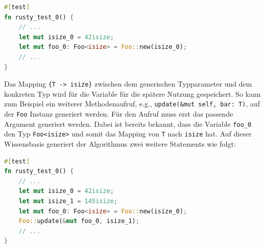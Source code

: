\documentclass{article}
\begin{document}
\begin{lstlisting}[language=Rust, style=boxed, caption={}, label=lst:building-generic-test-1]
#[test]
fn rusty_test_0() {
    // ...
    let mut isize_0 = 42isize;
    let mut foo_0: Foo<isize> = Foo::new(isize_0);
    // ...
}
\end{lstlisting}

Das Mapping \lstinline|{T -> isize}| zwischen dem generischen Typparameter und dem konkreten Typ wird für die Variable für die spätere Nutzung gespeichert. So kann zum Beispiel ein weiterer Methodenaufruf, e.g., \lstinline{update(&mut self, bar: T)}, auf der \lstinline{Foo} Instanz generiert werden. Für den Aufruf muss erst das passende Argument generiert werden. Dabei ist bereits bekannt, dass die Variable \lstinline{foo_0} den Typ \lstinline{Foo<isize>} und somit das Mapping von \lstinline{T} nach \lstinline{isize} hat. Auf dieser Wissensbasis generiert der Algorithmus zwei weitere Statements wie folgt:
\begin{lstlisting}[language=Rust, style=boxed, caption={}, label=lst:building-generic-test-2]
#[test]
fn rusty_test_0() {
    // ...
    let mut isize_0 = 42isize;
    let mut isize_1 = 145isize;
    let mut foo_0: Foo<isize> = Foo::new(isize_0);
    Foo::update(&mut foo_0, isize_1);
    // ...
}
\end{lstlisting}



%
%
%
\end{document}
